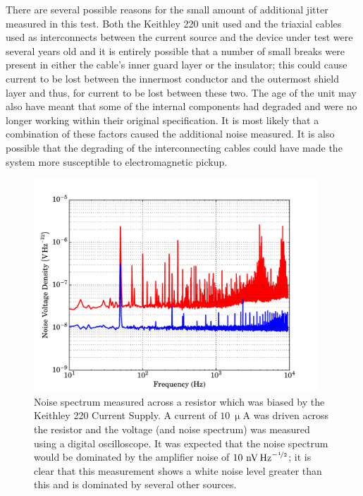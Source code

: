 \par 
There are several possible reasons for the small amount of additional jitter measured in this test. Both the Keithley 220 unit used and the triaxial cables used as interconnects between the current source and the device under test were several years old and it is entirely possible that a number of small breaks were present in either the cable's inner guard layer or the insulator; this could cause current to be lost between the innermost conductor and the outermost shield layer and thus, for current to be lost between these two. The age of the unit may also have meant that some of the internal components had degraded and were no longer working within their original specification. It is most likely that a combination of these factors caused the additional noise measured. It is also possible that the degrading of the interconnecting cables could have made the system more susceptible to electromagnetic pickup.
\begin{figure}[t]
\begin{center}
\includegraphics[width = 0.95\textwidth]{figures/keithley220_noise}
\caption[Noise spectrum from a Keithley 220 Current Source]{Noise spectrum measured across a resistor which was biased by the Keithley 220 Current Supply. A current of $10~\mathrm{\upmu A}$ was driven across the resistor and the voltage (and noise spectrum) was measured using a digital oscilloscope. It was expected that the noise spectrum would be dominated by the amplifier noise of $10~\mathrm{nV\,Hz}^{-\nicefrac{1}{2}}$; it is clear that this measurement shows a white noise level greater than this and is dominated by several other sources.}
\label{fig:Keithley220_noise}
\end{center}
\end{figure}
